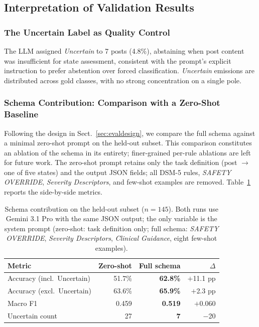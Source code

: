 \documentclass[runningheads]{llncs}
\begin{document}
\subsection{Interpretation of Validation Results}

\subsubsection{The Uncertain Label as Quality Control}
The LLM assigned \emph{Uncertain} to 7 posts (4.8\%), abstaining when post content was insufficient for state assessment, consistent with the prompt's explicit instruction to prefer abstention over forced classification. \emph{Uncertain} emissions are distributed across gold classes, with no strong concentration on a single pole.

\subsubsection{Schema Contribution: Comparison with a Zero-Shot Baseline}
Following the design in Sect.~\ref{sec:evaldesign}, we compare the full schema against a minimal zero-shot prompt on the held-out subset. This comparison constitutes an ablation of the schema in its entirety; finer-grained per-rule ablations are left for future work. The zero-shot prompt retains only the task definition (post $\rightarrow$ one of five states) and the output JSON fields; all DSM-5 rules, \emph{SAFETY OVERRIDE}, \emph{Severity Descriptors}, and few-shot examples are removed. Table~\ref{tab:zeroshot} reports the side-by-side metrics.

\begin{table}[t]
\caption{Schema contribution on the held-out subset ($n=145$). Both runs use Gemini 3.1 Pro with the same JSON output; the only variable is the system prompt (zero-shot: task definition only; full schema: \emph{SAFETY OVERRIDE}, \emph{Severity Descriptors}, \emph{Clinical Guidance}, eight few-shot examples).}
\label{tab:zeroshot}
\centering
\setlength{\tabcolsep}{8pt}
\begin{tabular}{lrrr}
\toprule
\textbf{Metric} & \textbf{Zero-shot} & \textbf{Full schema} & \textbf{$\Delta$} \\
\midrule
Accuracy (incl.\ Uncertain) & 51.7\% & \textbf{62.8\%} & $+$11.1 pp \\
Accuracy (excl.\ Uncertain) & 63.6\% &  \textbf{65.9\%} & $+$2.3 pp \\
Macro F1 & 0.459 & \textbf{0.519} & $+$0.060 \\
Uncertain count & 27 & \textbf{7} & $-$20 \\
\bottomrule
\end{tabular}
\end{table}
\end{document}
